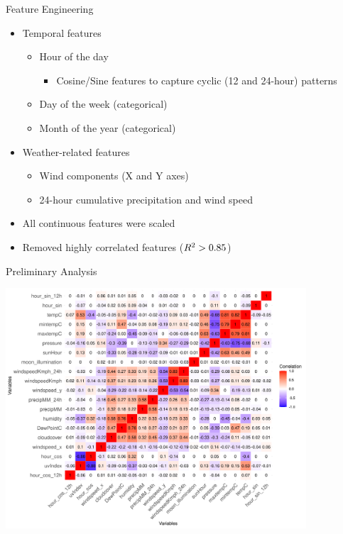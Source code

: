 \documentclass[svgnames, 12pt]{beamer}
\begin{document}
\begin{frame}{Feature Engineering}
\begin{itemize}
    \item Temporal features
        \begin{itemize}
            \item Hour of the day
                \begin{itemize}
                    \item Cosine/Sine features to capture cyclic (12 and 24-hour) patterns
                \end{itemize}
            \item Day of the week (categorical)
            \item Month of the year (categorical)
        \end{itemize}
    \item Weather-related features
        \begin{itemize}
            \item Wind components (X and Y axes)
            \item 24-hour cumulative precipitation and wind speed
        \end{itemize}
    \item All continuous features were scaled
    \item Removed highly correlated features ($R\textsuperscript{2} > 0.85$)
\end{itemize}
\end{frame}

\begin{frame}{Preliminary Analysis}
    \vspace{0.5em}
    \begin{center}
        \includegraphics[width=0.84\textwidth]{assets/feature-correlation-matrix-final.png}
    \end{center}
    \vfill
\end{frame}
\end{document}
